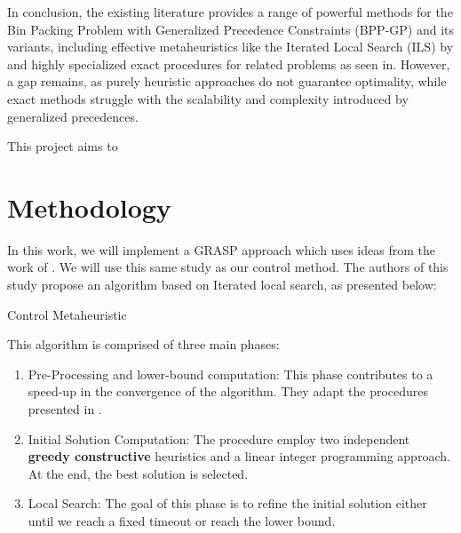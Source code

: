 \documentclass[12pt]{article}
\begin{document}
In conclusion, the existing literature provides a range of powerful methods for the Bin Packing Problem with Generalized 
Precedence Constraints (BPP-GP) and its variants, including effective metaheuristics like the Iterated 
Local Search (ILS) by \cite{kramer:17} and highly specialized exact procedures for related problems 
as seen in\cite{pereira:16}. However, a gap remains, as purely heuristic approaches do not guarantee optimality, 
while exact methods struggle with the scalability and complexity introduced by generalized precedences. 

This project aims to %

\newpage
\section{Methodology}

In this work, we will implement a GRASP approach which uses ideas from the work of \cite{kramer:17}. We will use this same study as our control method. The authors of this study propose an algorithm based on Iterated local search, as presented below:

\begin{algorithm}[H]
  \footnotesize
{}
\caption{Control Metaheuristic}
\end{algorithm}

This algorithm is comprised of three main phases:
\begin{enumerate}
  \item Pre-Processing and lower-bound computation: This phase contributes to a speed-up in the convergence of the algorithm. They adapt the procedures presented in \cite{dell2012bin}.
  \item Initial Solution Computation: The procedure employ two independent \textbf{greedy constructive} heuristics and a linear integer programming approach. At the end, the best solution is selected.
  \item Local Search: The goal of this phase is to refine the initial solution either until we reach a fixed timeout or reach the lower bound. 
\end{enumerate}
\end{document}
